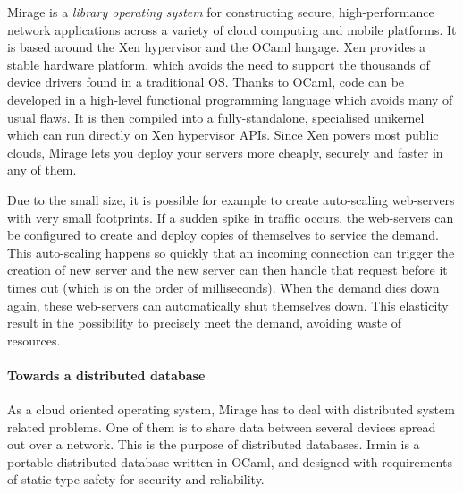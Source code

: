\documentclass{article}
\renewcommand{\-}{\hyp}
\newcommand{\irmin}{Irmin\xspace}
\newcommand{\mirage}{Mirage\xspace}
\newcommand{\ocaml}{OCaml\xspace}
\newcommand{\xen}{Xen\xspace}
\begin{document}
\mirage is a \emph{library operating system}\cite{LibraryOperatingSystemsCloud2013} for constructing secure, high-performance network applications across a variety of cloud computing and mobile platforms.
It is based around the \xen hypervisor and the \ocaml langage.
\xen\cite{XenArtVirtualization2003} provides a stable hardware platform, which avoids the need to support the thousands of device drivers found in a traditional OS.
Thanks to \ocaml\cite{CreatingFunctionalInternet2007}, code can be developed in a high-level functional programming language which avoids many of usual flaws.
It is then compiled into a fully-standalone, specialised unikernel which can run directly on \xen hypervisor APIs.
Since \xen powers most public clouds, \mirage lets you deploy your servers more cheaply, securely and faster in any of them.

Due to the small size, it is possible for example to create auto-scaling web-servers with very small footprints.
If a sudden spike in traffic occurs, the web-servers can be configured to create and deploy copies of themselves to service the demand.
This auto-scaling happens so quickly that an incoming connection can trigger the creation of new server and the new server can then handle that request before it times out (which is on the order of milliseconds).
When the demand dies down again, these web-servers can automatically shut themselves down.
This elasticity result in the possibility to precisely meet the demand, avoiding waste of resources.

\paragraph{Towards a distributed database}
As a cloud oriented operating system, \mirage has to deal with distributed system related problems.
One of them is to share data between several devices spread out over a network.
This is the purpose of distributed databases.
\irmin is a portable distributed database written in \ocaml, and designed with  requirements of static type-safety for security and reliability.

\end{document}
